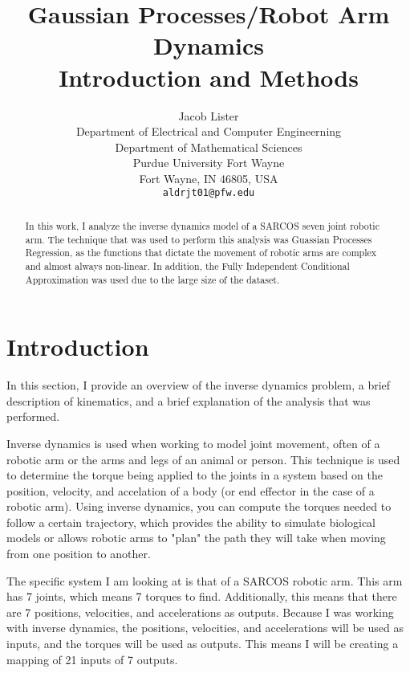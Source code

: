 \documentclass{article}
\title{Gaussian Processes/Robot Arm Dynamics \\ Introduction and Methods}
\author {Jacob Lister                              \\
Department of Electrical and Computer Engineerning \\
Department of Mathematical Sciences                \\
Purdue University Fort Wayne                       \\
Fort Wayne, IN 46805, USA                          \\
\texttt{aldrjt01@pfw.edu}
}
\begin{document}
    \maketitle

    \begin{abstract}
        In this work, I analyze the inverse dynamics model of a SARCOS seven joint robotic arm.
        The technique that was used to perform this analysis was Guassian Processes Regression,
        as the functions that dictate the movement of robotic arms are complex and almost always
        non-linear. In addition, the Fully Independent Conditional Approximation was used
        due to the large size of the dataset.
    \end{abstract}

    \section{Introduction}
    

    In this section, I provide an overview of the inverse dynamics problem, a brief description
    of kinematics, and a brief explanation of the analysis that was performed.
    
    Inverse dynamics is used when working to model joint movement, often of a robotic arm or
    the arms and legs of an animal or person. This technique is used to determine the torque
    being applied to the joints in a system based on the position, velocity, and accelation of
    a body (or end effector in the case of a robotic arm). Using inverse dynamics, you can
    compute the torques needed to follow a certain trajectory, which provides the ability to
    simulate biological models or allows robotic arms to "plan" the path they will take when
    moving from one position to another.
    
    The specific system I am looking at is that of a SARCOS robotic arm. This arm has 7 joints,
    which means 7 torques to find. Additionally, this means that there are 7 positions, velocities,
    and accelerations as outputs. Because I was working with inverse dynamics, the positions,
    velocities, and accelerations will be used as inputs, and the torques will be used as outputs.
    This means I will be creating a mapping of 21 inputs of 7 outputs.
    
\end{document}
